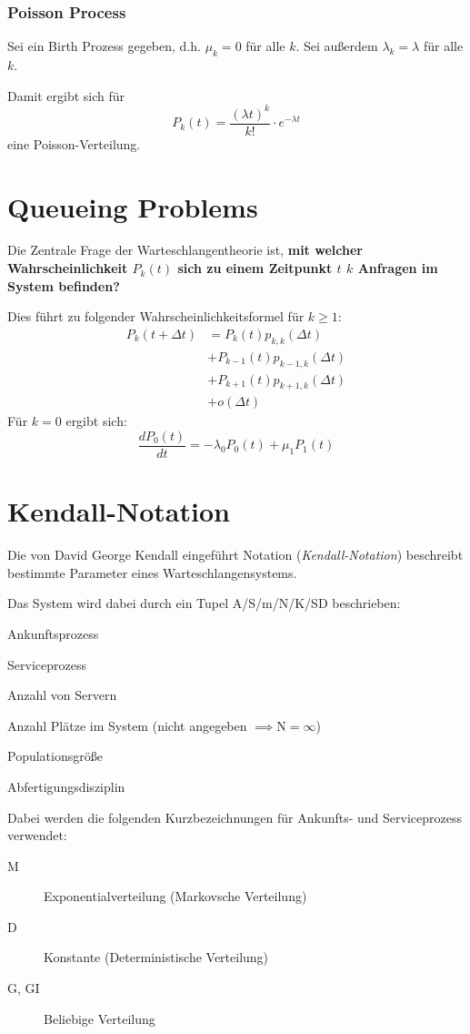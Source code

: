 			\subsubsection{Poisson Process} %
				Sei ein Birth Prozess gegeben, d.h. \( \mu _ k = 0 \) für alle \(k\). Sei außerdem \( \lambda _ k = \lambda \) für alle \(k\).
				
				Damit ergibt sich für \[ P _ k (t) = \frac{(\lambda t ) ^ k}{k!} \cdot e ^ { -\lambda t } \] eine Poisson-Verteilung.
	
	\section{Queueing Problems}
		Die Zentrale Frage der Warteschlangentheorie ist, \textbf{mit welcher Wahrscheinlichkeit \(P_k(t)\) sich zu einem Zeitpunkt \(t\) \(k\) Anfragen im System befinden?}
		
		Dies führt zu folgender Wahrscheinlichkeitsformel für \(k \geq 1\):
		\begin{align*}
			P _ k (t + \Delta t) & = P _ k (t) p _ {k, k} (\Delta t)           \\
			                     & + P _ {k - 1} (t) p _ {k - 1, k} (\Delta t) \\
			                     & + P _ {k + 1} (t) p _ {k + 1, k} (\Delta t) \\
			                     & + o(\Delta t)
		\end{align*}
		Für \(k = 0\) ergibt sich:
		\begin{equation*}
			\frac{d P _ 0 (t)}{dt} = -\lambda _ 0 P _ 0 (t) + \mu _ 1 P _ 1 (t)
		\end{equation*}
	
	\section{Kendall-Notation}
		Die von David George Kendall eingeführt Notation (\textit{Kendall-Notation}) beschreibt bestimmte Parameter eines Warteschlangensystems.
		
		Das System wird dabei durch ein Tupel A/S/m/N/K/SD beschrieben:
		\begin{description}[leftmargin = 1cm]
			\item[A] Ankunftsprozess
			\item[S] Serviceprozess
			\item[m] Anzahl von Servern
			\item[N] Anzahl Plätze im System (nicht angegeben \( \implies \text{N} = \infty \))
			\item[K] Populationsgröße
			\item[SD] Abfertigungsdisziplin
		\end{description}
		Dabei werden die folgenden Kurzbezeichnungen für Ankunfts- und Serviceprozess verwendet:
		\begin{description}
			\item[M] Exponentialverteilung (Markovsche Verteilung)
			\item[D] Konstante (Deterministische Verteilung)
			\item[G, GI] Beliebige Verteilung
		\end{description}
		
